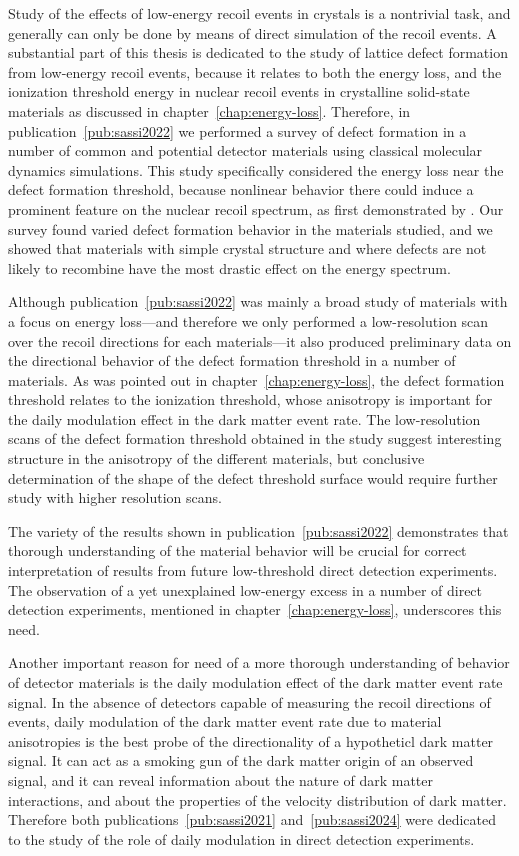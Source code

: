 \documentclass[b5paper, 10pt, twoside]{book}
\begin{document}
Study of the effects of low-energy recoil events in crystals is a nontrivial task, and generally can only be done by means of direct simulation of the recoil events. A substantial part of this thesis is dedicated to the study of lattice defect formation from low-energy recoil events, because it relates to both the energy loss, and the ionization threshold energy in nuclear recoil events in crystalline solid-state materials as discussed in chapter~\ref{chap:energy-loss}. Therefore, in publication~\ref{pub:sassi2022} we performed a survey of defect formation in a number of common and potential detector materials using classical molecular dynamics simulations. This study specifically considered the energy loss near the defect formation threshold, because nonlinear behavior there could induce a prominent feature on the nuclear recoil spectrum, as first demonstrated by \textcite{KadribasicEtAl2020}. Our survey found varied defect formation behavior in the materials studied, and we showed that materials with simple crystal structure and where defects are not likely to recombine have the most drastic effect on the energy spectrum.

Although publication~\ref{pub:sassi2022} was mainly a broad study of materials with a focus on energy loss---and therefore we only performed a low-resolution scan over the recoil directions for each materials---it also produced preliminary data on the directional behavior of the defect formation threshold in a number of materials. As was pointed out in chapter~\ref{chap:energy-loss}, the defect formation threshold relates to the ionization threshold, whose anisotropy is important for the daily modulation effect in the dark matter event rate. The low-resolution scans of the defect formation threshold obtained in the study suggest interesting structure in the anisotropy of the different materials, but conclusive determination of the shape of the defect threshold surface would require further study with higher resolution scans.

The variety of the results shown in publication~\ref{pub:sassi2022} demonstrates that thorough understanding of the material behavior will be crucial for correct interpretation of results from future low-threshold direct detection experiments. The observation of a yet unexplained low-energy excess in a number of direct detection experiments, mentioned in chapter~\ref{chap:energy-loss}, underscores this need.

Another important reason for need of a more thorough understanding of behavior of detector materials is the daily modulation effect of the dark matter event rate signal. In the absence of detectors capable of measuring the recoil directions of events, daily modulation of the dark matter event rate due to material anisotropies is the best probe of the directionality of a hypotheticl dark matter signal. It can act as a smoking gun of the dark matter origin of an observed signal, and it can reveal information about the nature of dark matter interactions, and about the properties of the velocity distribution of dark matter. Therefore both publications~\ref{pub:sassi2021} and~\ref{pub:sassi2024} were dedicated to the study of the role of daily modulation in direct detection experiments.
\end{document}
